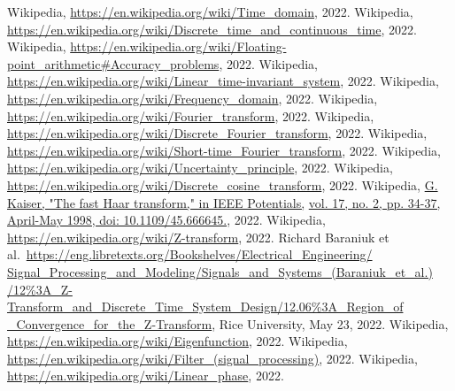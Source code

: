 \clearpage
{}
\begin{thebibliography}{9}
        \footnotesize{
         Wikipedia, \underline{https://en.wikipedia.org/wiki/Time\_domain}, 2022.
         Wikipedia, \underline{https://en.wikipedia.org/wiki/Discrete\_time\_and\_continuous\_time}, 2022.
         Wikipedia, \underline{https://en.wikipedia.org/wiki/Floating-point\_arithmetic\#Accuracy\_problems}, 2022.
         Wikipedia, \underline{https://en.wikipedia.org/wiki/Linear\_time-invariant\_system}, 2022.
         Wikipedia, \underline{https://en.wikipedia.org/wiki/Frequency\_domain}, 2022.
         Wikipedia, \underline{https://en.wikipedia.org/wiki/Fourier\_transform}, 2022.
         Wikipedia, \underline{https://en.wikipedia.org/wiki/Discrete\_Fourier\_transform}, 2022.
         Wikipedia, \underline{https://en.wikipedia.org/wiki/Short-time\_Fourier\_transform}, 2022.
         Wikipedia, \underline{https://en.wikipedia.org/wiki/Uncertainty\_principle}, 2022.
         Wikipedia, \underline{https://en.wikipedia.org/wiki/Discrete\_cosine\_transform}, 2022.
         Wikipedia, \underline{G. Kaiser, "The fast Haar transform," in IEEE Potentials,} \underline{vol. 17, no. 2, pp. 34-37, April-May 1998, doi: 10.1109/45.666645.}, 2022.
         Wikipedia, \underline{https://en.wikipedia.org/wiki/Z-transform}, 2022.
         Richard Baraniuk et al.\ \underline{https://eng.libretexts.org/Bookshelves/Electrical\_Engineering/} \underline{Signal\_Processing\_and\_Modeling/Signals\_and\_Systems\_(Baraniuk\_et\_al.)} \underline{/12\%3A\_Z-Transform\_and\_Discrete\_Time\_System\_Design/12.06\%3A\_Region\_of} \underline{\_Convergence\_for\_the\_Z-Transform}, Rice University, May 23, 2022.
         Wikipedia, \underline{https://en.wikipedia.org/wiki/Eigenfunction}, 2022.
         Wikipedia, \underline{https://en.wikipedia.org/wiki/Filter\_(signal\_processing)}, 2022.
         Wikipedia, \underline{https://en.wikipedia.org/wiki/Linear\_phase}, 2022.
        }
\end{thebibliography}

